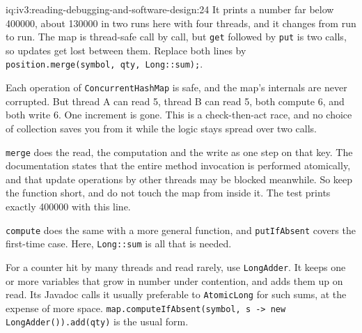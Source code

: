 \begin{solution}{iq:iv3:reading-debugging-and-software-design:24}
It prints a number far below 400000, about 130000 in two runs here with four threads, and it changes from run to run. The map is thread-safe call by call, but \texttt{get} followed by \texttt{put} is two calls, so updates get lost between them. Replace both lines by \texttt{position.merge(symbol, qty, Long::sum);}.

Each operation of \texttt{ConcurrentHashMap} is safe, and the map's internals are never corrupted. But thread A can read 5, thread B can read 5, both compute 6, and both write 6. One increment is gone. This is a check-then-act race, and no choice of collection saves you from it while the logic stays spread over two calls.

\texttt{merge} does the read, the computation and the write as one step on that key. The documentation states that the entire method invocation is performed atomically, and that update operations by other threads may be blocked meanwhile. So keep the function short, and do not touch the map from inside it. The test prints exactly 400000 with this line.

\texttt{compute} does the same with a more general function, and \texttt{putIfAbsent} covers the first-time case. Here, \texttt{Long::sum} is all that is needed.

For a counter hit by many threads and read rarely, use \texttt{LongAdder}. It keeps one or more variables that grow in number under contention, and adds them up on read. Its Javadoc calls it usually preferable to \texttt{AtomicLong} for such sums, at the expense of more space. \texttt{map.computeIfAbsent(symbol, s -> new LongAdder()).add(qty)} is the usual form.


\end{solution}

